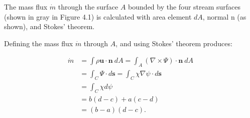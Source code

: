 \documentclass{article}
\begin{document}
The mass flux $\dot{m}$ through the surface $A$ bounded by the four stream surfaces (shown in gray in Figure 4.1) is calculated with area element $dA$, normal n (as shown), and Stokes' theorem.

Defining the mass flux $\dot{m}$ through $A$, and using Stokes' theorem produces:

$$
\begin{aligned}
\dot{m} &= \int\rho\mathbf{u}\cdot\mathbf{n}\ dA = \int_A (\nabla\times\Psi)\cdot\mathbf{n}\ dA \\
&= \int_C \Psi\cdot d\mathbf{s} = \int_C \chi\nabla\psi\cdot d\mathbf{s} \\
&= \int_C \chi d\psi \\
&= b(d-c) + a(c-d) \\
&= (b-a)(d-c).
\end{aligned}
$$
\end{document}
